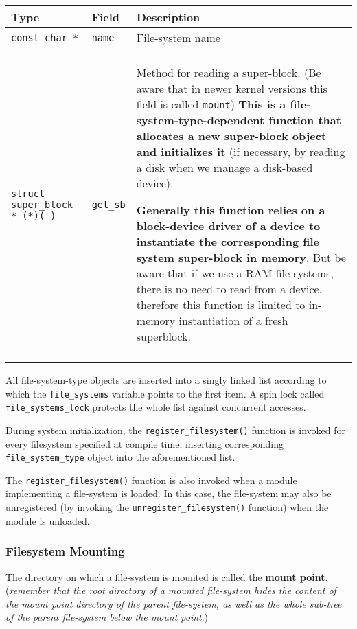 \documentclass[10pt,a4paper]{article}
\begin{document}
\begin{center}
\begin{tabular}{l|l|p{13cm}} 

\toprule
Type & Field & Description \\
\midrule

\texttt{const char *} & \texttt{name} & File-system name\\\\

\texttt{struct super\_block * (*)( )} & \texttt{get\_sb} & Method for reading a super-block. (Be aware that in newer kernel versions this field is called \texttt{mount}) \textbf{This is a file-system-type-dependent function that allocates a new super-block object and initializes it} (if necessary, by reading a disk when we manage a disk-based device).

\textbf{Generally this function relies on a block-device driver of a device to instantiate the corresponding file system super-block in memory}. But be aware that if we use a RAM file systems, there is no need to read 
from a device, therefore this function is limited to in-memory instantiation of a fresh superblock.\\\\

\bottomrule
\end{tabular}
\end{center}

All file-system-type objects are inserted into a singly linked list according to which the \texttt{file\_systems} variable points to the first item. A spin lock called \texttt{file\_systems\_lock} protects the whole list against concurrent accesses.

During system initialization, the \texttt{register\_filesystem()} function is invoked for every filesystem specified at compile time, inserting corresponding \texttt{file\_system\_type} object into the aforementioned list.

The \texttt{register\_filesystem()} function is also invoked when a module implementing a file-system is loaded. In this case, the file-system may also be unregistered (by invoking the \texttt{unregister\_filesystem()} function) when the module is unloaded.

\subsubsection{Filesystem Mounting}

The directory on which a file-system is mounted is called the \textbf{mount point}. (\textit{remember that the root directory of a mounted file-system hides the content of the mount point directory of the parent file-system, as well as the whole sub-tree of the parent file-system below the mount point}.)
\end{document}
